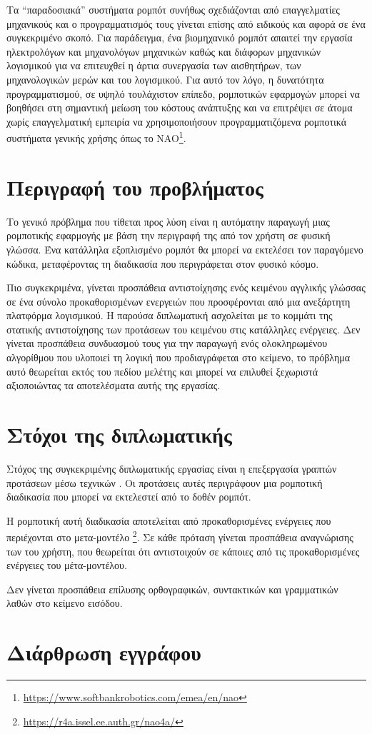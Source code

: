 Τα \enquote{παραδοσιακά} συστήματα ρομπότ συνήθως σχεδιάζονται από επαγγελματίες μηχανικούς και ο προγραμματισμός τους γίνεται επίσης από ειδικούς και αφορά σε ένα συγκεκριμένο σκοπό.
Για παράδειγμα, ένα βιομηχανικό ρομπότ απαιτεί την εργασία ηλεκτρολόγων και μηχανολόγων μηχανικών καθώς και διάφορων μηχανικών λογισμικού για να επιτευχθεί η άρτια συνεργασία των αισθητήρων, των μηχανολογικών μερών και του λογισμικού.
Για αυτό τον λόγο, η δυνατότητα προγραμματισμού, σε υψηλό τουλάχιστον επίπεδο, ρομποτικών εφαρμογών μπορεί να βοηθήσει στη σημαντική μείωση του κόστους ανάπτυξης και να επιτρέψει σε άτομα χωρίς επαγγελματική εμπειρία να χρησιμοποιήσουν προγραμματιζόμενα ρομποτικά συστήματα γενικής χρήσης όπως το NAO\footnote{\url{https://www.softbankrobotics.com/emea/en/nao}}.

\section{Περιγραφή του προβλήματος}\label{sec:problem-description}
Το γενικό πρόβλημα που τίθεται προς λύση είναι η αυτόματην παραγωγή μιας ρομποτικής εφαρμογής με βάση την περιγραφή της από τον χρήστη σε φυσική γλώσσα.
Ένα κατάλληλα εξοπλισμένο ρομπότ θα μπορεί να εκτελέσει τον παραγόμενο κώδικα, μεταφέροντας τη διαδικασία που περιγράφεται στον φυσικό κόσμο.

Πιο συγκεκριμένα, γίνεται προσπάθεια αντιστοίχησης ενός κειμένου αγγλικής γλώσσας σε ένα σύνολο προκαθορισμένων ενεργειών που προσφέρονται από μια ανεξάρτητη πλατφόρμα λογισμικού.
Η παρούσα διπλωματική ασχολείται με το κομμάτι της στατικής αντιστοίχησης των προτάσεων του κειμένου στις κατάλληλες ενέργειες.
Δεν γίνεται προσπάθεια συνδυασμού τους για την παραγωγή ενός ολοκληρωμένου αλγορίθμου που υλοποιεί τη λογική που προδιαγράφεται στο κείμενο,
το πρόβλημα αυτό θεωρείται εκτός του πεδίου μελέτης και μπορεί να επιλυθεί ξεχωριστά αξιοποιώντας τα αποτελέσματα αυτής της εργασίας.

\section{Στόχοι της διπλωματικής}\label{sec:diploma-purpose}
Στόχος της συγκεκριμένης διπλωματικής εργασίας είναι η επεξεργασία γραπτών προτάσεων μέσω τεχνικών
.
Οι προτάσεις αυτές περιγράφουν μια ρομποτική διαδικασία που μπορεί να εκτελεστεί από το δοθέν ρομπότ.

Η ρομποτική αυτή διαδικασία αποτελείται από προκαθορισμένες ενέργειες που περιέχονται στο μετα-μοντέλο \metamodel{}\footnote{\url{https://r4a.issel.ee.auth.gr/nao4a/}}.
Σε κάθε πρόταση γίνεται προσπάθεια αναγνώρισης των  του χρήστη,
που θεωρείται ότι αντιστοιχούν σε κάποιες από τις προκαθορισμένες ενέργειες του μέτα-μοντέλου.

Δεν γίνεται προσπάθεια επίλυσης ορθογραφικών, συντακτικών και γραμματικών λαθών στο κείμενο εισόδου.

\section{Διάρθρωση εγγράφου}\label{sec:structure}

